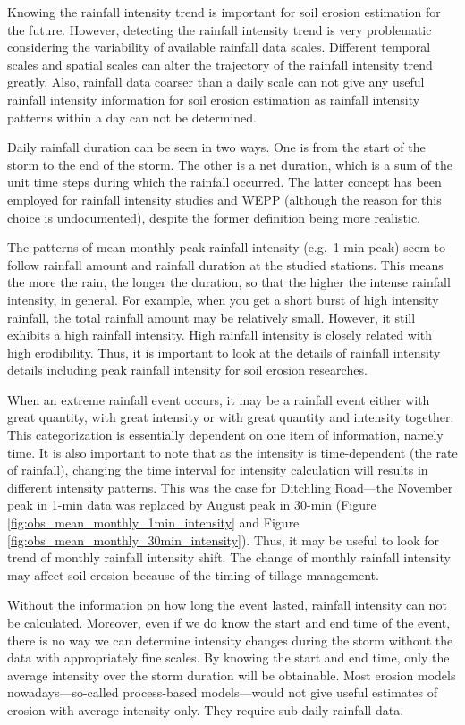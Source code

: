 Knowing the rainfall intensity trend is important for soil erosion estimation
for the future. However, detecting the rainfall intensity trend is very
problematic considering the variability of available rainfall data scales.
Different temporal scales and spatial scales can alter the trajectory of the
rainfall intensity trend greatly. Also, rainfall data coarser than a daily scale
can not give any useful rainfall intensity information for soil erosion
estimation as rainfall intensity patterns within a day can not be determined.

Daily rainfall duration can be seen in two ways. One is from the start of the
storm to the end of the storm. The other is a net duration, which is a sum of
the unit time steps during which the rainfall occurred. The latter concept has
been employed for rainfall intensity studies and WEPP (although the reason for
this choice is undocumented), despite the former definition being more
realistic.

The patterns of mean monthly peak rainfall intensity (e.g.\ 1-min peak) seem to
follow rainfall amount and rainfall duration at the studied stations. This means
the more the rain, the longer the duration, so that the higher the intense
rainfall intensity, in general. For example, when you get a short burst of high
intensity rainfall, the total rainfall amount may be relatively small. However,
it still exhibits a high rainfall intensity. High rainfall intensity is closely
related with high erodibility. Thus, it is important to look at the details of
rainfall intensity details including peak rainfall intensity for soil erosion
researches.

When an extreme rainfall event occurs, it may be a rainfall event either with
great quantity, with great intensity or with great quantity and intensity
together. This categorization is essentially dependent on one item of
information, namely time. It is also important to note that as the intensity is
time-dependent (the rate of rainfall), changing the time interval for intensity
calculation will results in different intensity patterns. This was the case for
Ditchling Road---the November peak in 1-min data was replaced by August peak in
30-min (Figure \ref{fig:obs_mean_monthly_1min_intensity} and Figure
\ref{fig:obs_mean_monthly_30min_intensity}). Thus, it may be useful to look for
trend of monthly rainfall intensity shift. The change of monthly rainfall
intensity may affect soil erosion because of the timing of tillage management.

Without the information on how long the event lasted, rainfall intensity can not
be calculated. Moreover, even if we do know the start and end time of the event,
there is no way we can determine intensity changes during the storm without the
data with appropriately fine scales. By knowing the start and end time, only the
average intensity over the storm duration will be obtainable. Most erosion
models nowadays---so-called process-based models---would not give useful
estimates of erosion with average intensity only. They require sub-daily
rainfall data.


